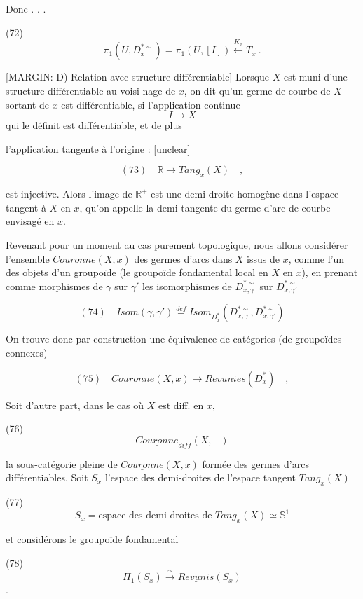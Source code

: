 Donc . . .

(72) $$\pi_1(U, D_x^{*\sim}) = \pi_1(U, [I]) \overset{K_x}{\longleftarrow} T_x \ .$$

[MARGIN: D) Relation avec structure différentiable]
Lorsque $X$ est muni d'une structure
différentiable au voisi-nage de $x$, on dit
qu'un germe de courbe de $X$ sortant
de $x$ est différentiable, si l'application
continue
$$I \longrightarrow X$$
qui le définit est différentiable, et de plus

\newpage


l'application tangente à l'origine : [unclear]

$$(73) \quad \mathbb{R} \longrightarrow Tang_x(X) \quad ,$$

est injective. Alors l'image de $\mathbb{R}^+$ est
une demi-droite homogène dans l'espace
tangent à $X$ en $x$, qu'on appelle la
demi-tangente du germe d'arc de courbe
envisagé en $x$.

Revenant pour un moment au cas
purement topologique, nous allons considérer
l'ensemble $Couronne(X,x)$ des germes d'arcs
dans $X$ issus de $x$, comme l'un des
objets d'un groupoïde (le groupoïde
fondamental local en $X$ en $x$), en prenant
comme morphismes de $\gamma$ sur $\gamma'$
les isomorphismes de $D_{x,\gamma}^{*\sim}$ sur $D_{x,\gamma'}^{*\sim}$

$$(74) \quad Isom(\gamma, \gamma') \overset{def}{=} Isom_{D_x^*}(D_{x,\gamma}^{*\sim}, D_{x,\gamma'}^{*\sim})$$

On trouve donc par construction une équivalence de
catégories (de groupoïdes connexes)

$$(75) \quad Couronne(X,x) \longrightarrow Revunies(D_x^*) \quad ,$$

\newpage


Soit d'autre part, dans le cas où $X$ est diff.
en $x$,

(76) $$ \underline{Couronne}_{diff}(X,-) $$

la sous-catégorie pleine de $\underline{Couronne}(X,x)$
formée des germes d'arcs différentiables. Soit
$S_x$
l'espace des demi-droites de
l'espace tangent $Tang_x(X)$

(77) $$ S_x = \text{espace des demi-droites de } Tang_x(X) \simeq \mathbb{S}^1 $$

et considérons le groupoïde fondamental

(78) $$ \Pi_1(S_x) \overset{\simeq}{\longrightarrow} \underline{Revunis}(S_x) $$ .

